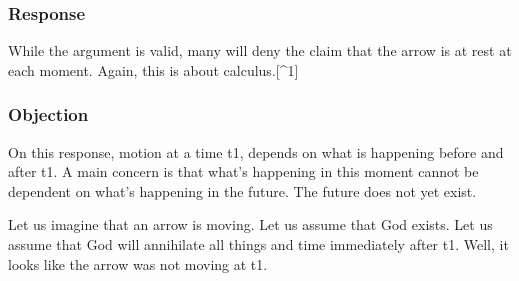 \documentclass[]{article}
\begin{document}
\subsubsection{Response}\label{response}

While the argument is valid, many will deny the claim that the arrow is
at rest at each moment. Again, this is about calculus.{[}\^{}1{]}

\subsubsection{Objection}\label{objection}

On this response, motion at a time t1, depends on what is happening
before and after t1. A main concern is that what's happening in this
moment cannot be dependent on what's happening in the future. The future
does not yet exist.

Let us imagine that an arrow is moving. Let us assume that God exists.
Let us assume that God will annihilate all things and time immediately
after t1. Well, it looks like the arrow was not moving at t1.
\end{document}
